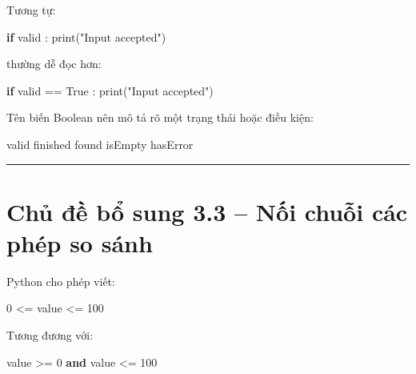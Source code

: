 \documentclass[
  11pt,
  a4paper,
]{article}
\newenvironment{Shaded}{}{}
\newcommand{\BuiltInTok}[1]{\textcolor[rgb]{0.00,0.50,0.00}{#1}}
\newcommand{\ControlFlowTok}[1]{\textcolor[rgb]{0.00,0.44,0.13}{\textbf{#1}}}
\newcommand{\DecValTok}[1]{\textcolor[rgb]{0.25,0.63,0.44}{#1}}
\newcommand{\KeywordTok}[1]{\textcolor[rgb]{0.00,0.44,0.13}{\textbf{#1}}}
\newcommand{\NormalTok}[1]{#1}
\newcommand{\OperatorTok}[1]{\textcolor[rgb]{0.40,0.40,0.40}{#1}}
\newcommand{\StringTok}[1]{\textcolor[rgb]{0.25,0.44,0.63}{#1}}
\newcommand{\VariableTok}[1]{\textcolor[rgb]{0.10,0.09,0.49}{#1}}
\begin{document}
Tương tự:

\begin{Shaded}
\begin{Highlighting}[]
\ControlFlowTok{if}\NormalTok{ valid :}
    \BuiltInTok{print}\NormalTok{(}\StringTok{"Input accepted"}\NormalTok{)}
\end{Highlighting}
\end{Shaded}

thường dễ đọc hơn:

\begin{Shaded}
\begin{Highlighting}[]
\ControlFlowTok{if}\NormalTok{ valid }\OperatorTok{==} \VariableTok{True}\NormalTok{ :}
    \BuiltInTok{print}\NormalTok{(}\StringTok{"Input accepted"}\NormalTok{)}
\end{Highlighting}
\end{Shaded}

Tên biến Boolean nên mô tả rõ một trạng thái hoặc điều kiện:

\begin{Shaded}
\begin{Highlighting}[]
\NormalTok{valid}
\NormalTok{finished}
\NormalTok{found}
\NormalTok{isEmpty}
\NormalTok{hasError}
\end{Highlighting}
\end{Shaded}

\begin{center}\rule{0.5\linewidth}{0.5pt}\end{center}

\section{Chủ đề bổ sung 3.3 -- Nối chuỗi các phép so
sánh}\label{chux1ee7-ux111ux1ec1-bux1ed5-sung-3.3-nux1ed1i-chuux1ed7i-cuxe1c-phuxe9p-so-suxe1nh}

Python cho phép viết:

\begin{Shaded}
\begin{Highlighting}[]
\DecValTok{0} \OperatorTok{\textless{}=}\NormalTok{ value }\OperatorTok{\textless{}=} \DecValTok{100}
\end{Highlighting}
\end{Shaded}

Tương đương với:

\begin{Shaded}
\begin{Highlighting}[]
\NormalTok{value }\OperatorTok{\textgreater{}=} \DecValTok{0} \KeywordTok{and}\NormalTok{ value }\OperatorTok{\textless{}=} \DecValTok{100}
\end{Highlighting}
\end{Shaded}
\end{document}
